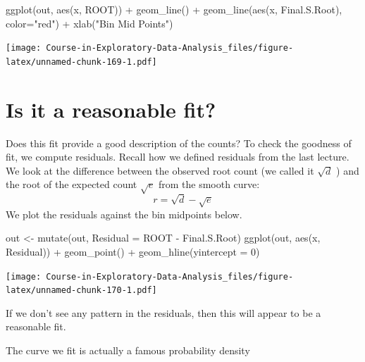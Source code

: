 \documentclass[
]{book}
\newenvironment{Shaded}{\begin{snugshade}}{\end{snugshade}}
\newcommand{\AttributeTok}[1]{\textcolor[rgb]{0.77,0.63,0.00}{#1}}
\newcommand{\DecValTok}[1]{\textcolor[rgb]{0.00,0.00,0.81}{#1}}
\newcommand{\FunctionTok}[1]{\textcolor[rgb]{0.00,0.00,0.00}{#1}}
\newcommand{\NormalTok}[1]{#1}
\newcommand{\OtherTok}[1]{\textcolor[rgb]{0.56,0.35,0.01}{#1}}
\newcommand{\SpecialCharTok}[1]{\textcolor[rgb]{0.00,0.00,0.00}{#1}}
\newcommand{\StringTok}[1]{\textcolor[rgb]{0.31,0.60,0.02}{#1}}
\begin{document}
\begin{Shaded}
\begin{Highlighting}[]
\FunctionTok{ggplot}\NormalTok{(out, }\FunctionTok{aes}\NormalTok{(x, ROOT)) }\SpecialCharTok{+}
  \FunctionTok{geom\_line}\NormalTok{() }\SpecialCharTok{+}
  \FunctionTok{geom\_line}\NormalTok{(}\FunctionTok{aes}\NormalTok{(x, Final.S.Root), }\AttributeTok{color=}\StringTok{"red"}\NormalTok{) }\SpecialCharTok{+}
  \FunctionTok{xlab}\NormalTok{(}\StringTok{"Bin Mid Points"}\NormalTok{)}
\end{Highlighting}
\end{Shaded}

\texttt{[image: Course-in-Exploratory-Data-Analysis\_files/figure-latex/unnamed-chunk-169-1.pdf]}

\hypertarget{is-it-a-reasonable-fit}{%
\section{Is it a reasonable fit?}\label{is-it-a-reasonable-fit}}

Does this fit provide a good description of the counts? To check the goodness of fit, we compute residuals. Recall how we defined residuals from the last lecture. We look at the difference between the observed root count (we called it \(\sqrt{d}\) ) and the root of the expected count \(\sqrt{e}\) from the smooth curve:
\[
r = \sqrt{d} - \sqrt{e}
\]
We plot the residuals against the bin midpoints below.

\begin{Shaded}
\begin{Highlighting}[]
\NormalTok{out }\OtherTok{\textless{}{-}} \FunctionTok{mutate}\NormalTok{(out,}
              \AttributeTok{Residual =}\NormalTok{ ROOT }\SpecialCharTok{{-}}\NormalTok{ Final.S.Root)}
\FunctionTok{ggplot}\NormalTok{(out, }\FunctionTok{aes}\NormalTok{(x, Residual)) }\SpecialCharTok{+}
  \FunctionTok{geom\_point}\NormalTok{() }\SpecialCharTok{+}
  \FunctionTok{geom\_hline}\NormalTok{(}\AttributeTok{yintercept =} \DecValTok{0}\NormalTok{)}
\end{Highlighting}
\end{Shaded}

\texttt{[image: Course-in-Exploratory-Data-Analysis\_files/figure-latex/unnamed-chunk-170-1.pdf]}

If we don't see any pattern in the residuals, then this will appear to be a reasonable fit.

The curve we fit is actually a famous probability density
\end{document}
